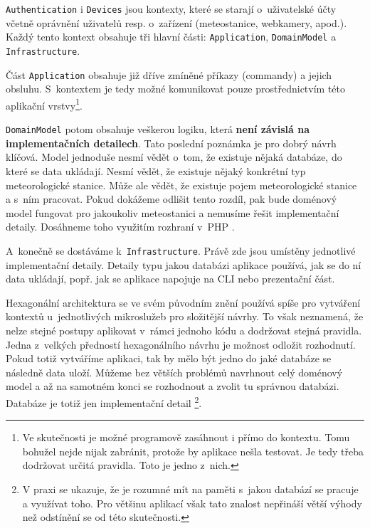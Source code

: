 \vspace{1em}
\vspace{1em}

\texttt{Authentication} i \texttt{Devices} jsou kontexty, které se starají o~uživatelské účty včetně oprávnění uživatelů resp. o~zařízení (meteostanice, webkamery, apod.). Každý tento kontext obsahuje tři hlavní části: \texttt{Application}, \texttt{DomainModel} a \texttt{Infrastructure}.

Část \texttt{Application} obsahuje již dříve zmíněné příkazy (commandy) a jejich obsluhu. S~kontextem je tedy možné komunikovat pouze prostřednictvím této aplikační vrstvy\footnote{Ve skutečnosti je možné programově zasáhnout i přímo do kontextu. Tomu bohužel nejde nijak zabránit, protože by aplikace nešla testovat. Je tedy třeba dodržovat určitá pravidla. Toto je jedno z~nich.}.

\texttt{DomainModel} potom obsahuje veškerou logiku, která \textbf{není závislá na implementačních detailech}. Tato poslední poznámka je pro dobrý návrh klíčová. Model jednoduše nesmí vědět o~tom, že existuje nějaká databáze, do které se data ukládají. Nesmí vědět, že existuje nějaký konkrétní typ meteorologické stanice. Může ale vědět, že existuje pojem meteorologické stanice a s~ním pracovat. Pokud dokážeme odlišit tento rozdíl, pak bude doménový model fungovat pro jakoukoliv meteostanici a nemusíme řešit implementační detaily. Dosáhneme toho využitím rozhraní v~PHP \cite{php:interfaces}.

A~konečně se dostáváme k~\texttt{Infrastructure}. Právě zde jsou umístěny jednotlivé implementační detaily. Detaily typu jakou databázi aplikace používá, jak se do ní data ukládají, popř. jak se aplikace napojuje na CLI nebo prezentační část.

Hexagonální architektura se ve svém původním znění používá spíše pro vytváření kontextů u~jednotlivých mikroslužeb pro složitější návrhy. To však neznamená, že nelze stejné postupy aplikovat v~rámci jednoho kódu a do\-dr\-žo\-vat stejná pravidla. Jedna z~velkých předností hexagonálního návrhu je možnost odložit rozhodnutí. Pokud totiž vytváříme aplikaci, tak by mělo být jedno do jaké databáze se následně data uloží. Můžeme bez větších problémů navrhnout celý doménový model a až na samotném konci se rozhodnout a zvolit tu správnou databázi. Databáze je totiž jen implementační detail \cite{screamingArchitecture}\footnote{V praxi se ukazuje, že je rozumné mít na paměti s~jakou databází se pracuje a využívat toho. Pro většinu aplikací však tato znalost nepřináší větší výhody než odstínění se od této skutečnosti.}.

